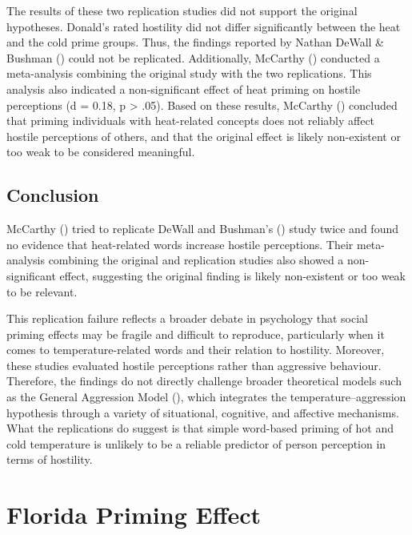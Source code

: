 \documentclass[
  letterpaper,
]{book}
\begin{document}
The results of these two replication studies did not support the
original hypotheses. Donald's rated hostility did not differ
significantly between the heat and the cold prime groups. Thus, the
findings reported by Nathan DeWall \& Bushman
() could not be replicated.
Additionally, McCarthy ()
conducted a meta-analysis combining the original study with the two
replications. This analysis also indicated a non-significant effect of
heat priming on hostile perceptions (d = 0.18, p \textgreater{} .05).
Based on these results, McCarthy
() concluded that priming
individuals with heat-related concepts does not reliably affect hostile
perceptions of others, and that the original effect is likely
non-existent or too weak to be considered meaningful.

\section{Conclusion}\label{conclusion-23}

McCarthy () tried to replicate
DeWall and Bushman's () study
twice and found no evidence that heat-related words increase hostile
perceptions. Their meta-analysis combining the original and replication
studies also showed a non-significant effect, suggesting the original
finding is likely non-existent or too weak to be relevant.

This replication failure reflects a broader debate in psychology that
social priming effects may be fragile and difficult to reproduce,
particularly when it comes to temperature-related words and their
relation to hostility. Moreover, these studies evaluated hostile
perceptions rather than aggressive behaviour. Therefore, the findings do
not directly challenge broader theoretical models such as the General
Aggression Model (), which integrates the temperature--aggression
hypothesis through a variety of situational, cognitive, and affective
mechanisms. What the replications do suggest is that simple word-based
priming of hot and cold temperature is unlikely to be a reliable
predictor of person perception in terms of hostility.


\chapter{\texorpdfstring{{Florida Priming
Effect}}{Florida Priming Effect}}\label{florida-priming-effect}
\end{document}
